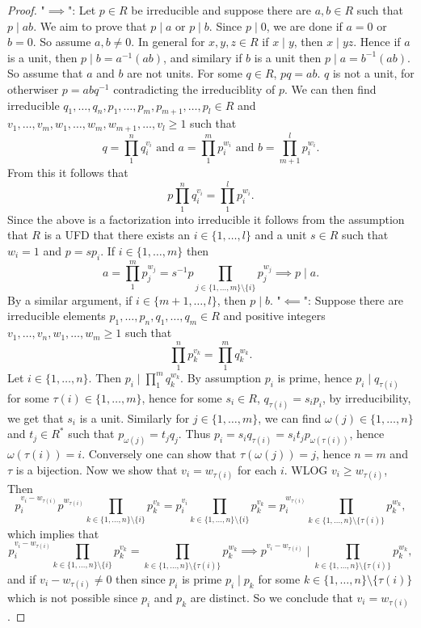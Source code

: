\begin{proof}
    "$\implies$": Let $p\in R$ be irreducible and suppose there are $a,b\in R$ such that $p\mid ab$. We aim to prove that $p\mid a$ or $p\mid b$. Since $p\mid 0$, we are done if $a = 0$ or $b=0$. So assume $a,b\neq 0$. In general for $x,y,z\in R$ if $x\mid y$, then $x\mid yz$. Hence if $a$ is a unit, then $p\mid b = a^{-1}(ab)$, and similary if $b$ is a unit then $p\mid a = b^{-1}(ab)$. So assume that $a$ and $b$ are not units. For some $q\in R$, $pq=ab$. $q$ is not a unit, for otherwiser $p = abq^{-1}$ contradicting the irreduciblity of $p$. We can then find irreducible $q_1,\dots,q_n,p_1,\dots,p_m,p_{m+1},\dots,p_l\in R$ and $v_1,\dots,v_m,w_1,\dots,w_m,w_{m+1},\dots,v_l\geq 1$ such that 
    $$q = \prod_1^n q_i^{v_i}\text{ and } a = \prod_1^m p_i^{w_i} \text{ and } b = \prod_{m+1}^{l} p_i^{w_i}.$$
    From this it follows that 
    $$p\prod_1^n q_i^{v_i} = \prod_1^{l}p_i^{w_i}.$$
    Since the above is a factorization into irreducible it follows from the assumption that $R$ is a UFD that there exists an $i\in\{1,\dots,l\}$ and a unit $s\in R$ such that $w_i = 1$ and  $p = sp_i$. If $i\in\{1,\dots,m\}$ then 
    $$a = \prod_1^m p_j^{w_j} = s^{-1}p\prod_{j\in\{1,\dots,m\}\setminus\{i\}} p_j^{w_j} \implies p \mid a.$$
    By a similar argument, if $i\in\{m+1,\dots,l\}$, then $p\mid b$.
    "$\impliedby$": Suppose there are irreducible elements $p_1,\dots,p_n,q_1,\dots,q_m\in R$ and positive integers $v_1,\dots,v_n,w_1,\dots,w_m\geq 1$ such that 
    $$\prod_1^n p_k^{v_k} =\prod_1^m q_k^{w_k}.$$
    Let $i\in\{1,\dots,n\}$. Then $p_i\mid \prod_1^m q_k^{w_k}$. By assumption $p_i$ is prime, hence $p_i \mid q_{\tau(i)}$ for some $\tau(i)\in\{1,\dots,m\}$, hence for some $s_{i}\in R$, $q_{\tau(i)}=s_ip_i$, by irreducibility, we get that $s_i$ is a unit. Similarly for $j\in\{1,\dots,m\}$, we can find $\omega(j)\in\{1,\dots,n\}$ and $t_{j}\in R^\ast$ such that $p_{\omega(j)} = t_jq_j$. Thus $p_i = s_iq_{\tau(i)} = s_it_jp_{\omega(\tau(i))}$, hence $\omega(\tau(i))=i$. Conversely one can show that $\tau(\omega(j))=j$, hence $n=m$ and $\tau$ is a bijection. Now we show that $v_i = w_{\tau(i)}$ for each $i$. WLOG $v_i\geq w_{\tau(i)}$, Then 
    $$p_i^{v_i-w_{\tau(i)}}p^{w_{\tau(i)}}\prod_{k\in\{1,\dots,n\}\setminus\{i\}} p_k^{v_k} =p_i^{v_i}\prod_{k\in\{1,\dots,n\}\setminus\{i\}} p_k^{v_k} = p_i^{w_{\tau(i)}}\prod_{k\in\{1,\dots,n\}\setminus\{\tau(i)\}} p_k^{w_k},$$
    which implies that 
    $$p_i^{v_i-w_{\tau(i)}}\prod_{k\in\{1,\dots,n\}\setminus\{i\}} p_k^{v_k} = \prod_{k\in\{1,\dots,n\}\setminus\{\tau(i)\}} p_k^{w_k}\implies p^{v_i-w_{\tau(i)}}\mid \prod_{k\in\{1,\dots,n\}\setminus\{\tau(i)\}} p_k^{w_k},$$
    and if $v_i-w_{\tau(i)}\neq 0 $ then since $p_i$ is prime $p_i\mid p_k$ for some $k\in\{1,\dots,n\}\setminus\{\tau(i)\}$ which is not possible since $p_i$ and $p_k$ are distinct. So we conclude that $v_i = w_{\tau(i)}$.
 \end{proof}
